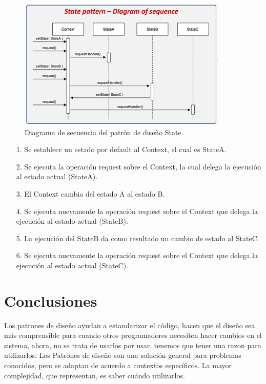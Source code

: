 \documentclass[12pt,letterpaper]{article}
\begin{document}
\begin{figure}[h]
    \begin{center}
    \includegraphics[width=10cm]{./Imagenes/image5.png}
    \caption{Diagrama de secuencia del patrón de diseño State.}
    \label{rg5}
    \end{center}
    \end{figure}
    

\begin{itemize}
    \item [1.] Se establece un estado por default al Context, el cual es StateA.
    \item [2.] Se ejecuta la operación request sobre el Context, la cual delega la ejecución al estado actual (StateA).
    \item [3.] El Context cambia del estado A al estado B.
    \item [4.] Se ejecuta nuevamente la operación request sobre el Context que delega la ejecución al estado actual (StateB).
    \item [5.] La ejecución del StateB da como resultado un cambio de estado al StateC.
    \item [6.] Se ejecuta nuevamente la operación request sobre el Context que delega la ejecución al estado actual (StateC).
\end{itemize}
 


\section{Conclusiones}
    Los patrones de diseño ayudan a estandarizar el código,
    hacen que el diseño sea más comprensible para cuando otros programadores necesiten hacer cambios en el sistema,
    ahora, no se trata de usarlos por usar, tenemos que tener una razon para utilizarlos.
	Los Patrones de diseño son una solución general para problemas conocidos, pero se adaptan de acuerdo a contextos específicos. 
	La mayor complejidad, que representan, es saber cuándo utilizarlos. 
\end{document}
